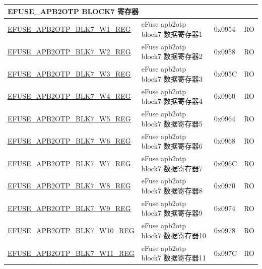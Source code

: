 \begin{longtable}{ | p{7cm} | p{6cm} | p{1.2cm} | p{1.5cm} | }
\multicolumn{4}{|l|}{\textbf{EFUSE\_APB2OTP BLOCK7 寄存器}} \\ \hline
\hyperref[regdesc:EFUSEAPB2OTPBLK7WNREG]{EFUSE\_APB2OTP\_BLK7\_W1\_REG} & eFuse apb2otp block7 数据寄存器1 & 0x0954 & RO \\\hline
\hyperref[regdesc:EFUSEAPB2OTPBLK7WNREG]{EFUSE\_APB2OTP\_BLK7\_W2\_REG} & eFuse apb2otp block7 数据寄存器2 & 0x0958 & RO \\\hline
\hyperref[regdesc:EFUSEAPB2OTPBLK7WNREG]{EFUSE\_APB2OTP\_BLK7\_W3\_REG} & eFuse apb2otp block7 数据寄存器3 & 0x095C & RO \\\hline
\hyperref[regdesc:EFUSEAPB2OTPBLK7WNREG]{EFUSE\_APB2OTP\_BLK7\_W4\_REG} & eFuse apb2otp block7 数据寄存器4 & 0x0960 & RO \\\hline
\hyperref[regdesc:EFUSEAPB2OTPBLK7WNREG]{EFUSE\_APB2OTP\_BLK7\_W5\_REG} & eFuse apb2otp block7 数据寄存器5 & 0x0964 & RO \\\hline
\hyperref[regdesc:EFUSEAPB2OTPBLK7WNREG]{EFUSE\_APB2OTP\_BLK7\_W6\_REG} & eFuse apb2otp block7 数据寄存器6 & 0x0968 & RO \\\hline
\hyperref[regdesc:EFUSEAPB2OTPBLK7WNREG]{EFUSE\_APB2OTP\_BLK7\_W7\_REG} & eFuse apb2otp block7 数据寄存器7 & 0x096C & RO \\\hline
\hyperref[regdesc:EFUSEAPB2OTPBLK7WNREG]{EFUSE\_APB2OTP\_BLK7\_W8\_REG} & eFuse apb2otp block7 数据寄存器8 & 0x0970 & RO \\\hline
\hyperref[regdesc:EFUSEAPB2OTPBLK7WNREG]{EFUSE\_APB2OTP\_BLK7\_W9\_REG} & eFuse apb2otp block7 数据寄存器9 & 0x0974 & RO \\\hline
\hyperref[regdesc:EFUSEAPB2OTPBLK7WNREG]{EFUSE\_APB2OTP\_BLK7\_W10\_REG} & eFuse apb2otp block7 数据寄存器10 & 0x0978 & RO \\\hline
\hyperref[regdesc:EFUSEAPB2OTPBLK7WNREG]{EFUSE\_APB2OTP\_BLK7\_W11\_REG} & eFuse apb2otp block7 数据寄存器11 & 0x097C & RO \\\hline


\end{longtable}
